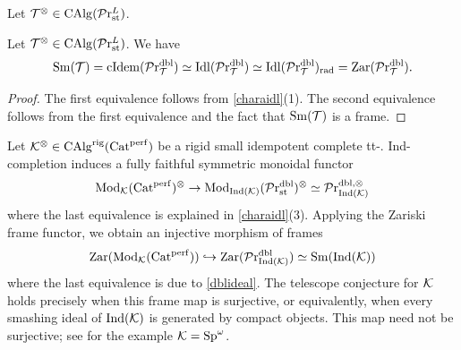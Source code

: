 \documentclass[10pt,a4paper,oneside]{article}
\begin{document}
\begin{rem}\label{charaidl}
Let $\totimes\in \calg(\prlst)$.
\end{rem}

\begin{thm}\label{dblideal}
Let $\totimes\in\calg(\prlst)$. We have
\[
\op{Sm}(\mct) = \cidem(\lintdbl)\simeq\idl(\lintdbl)\simeq\idl(\lintdbl)_{\op{rad}}=\zar(\lintdbl).
\]
\end{thm}

\begin{proof}
The first equivalence follows from \cref{charaidl}(1). The second equivalence follows from the first equivalence and the fact that $\op{Sm}(\mct)$ is a frame.
\end{proof}

\begin{rem}
Let $\mck^\otimes \in \calg^{\op{rig}}(\catper)$ be a rigid small idempotent complete tt-\infcat. Ind-completion induces a fully faithful symmetric monoidal functor
\[
\modu_{\mck}(\catper)^\otimes\to \modu_{\op{Ind}(\mck)}(\prstdbl)^\otimes\simeq \pr^{\op{dbl},\otimes}_{\op{Ind}(\mck)}\]
where the last equivalence is explained in \cref{charaidl}(3). Applying the Zariski frame functor, we obtain an injective morphism of frames
\[
\zar(\modu_{\mck}(\catper))\hookrightarrow \zar(\pr^{\op{dbl}}_{\op{Ind(\mck)}})\simeq\op{Sm}(\op{Ind}(\mck))
\]
where the last equivalence is due to \cref{dblideal}. The telescope conjecture for $\mck$ holds precisely when this frame map is surjective, or equivalently, when every smashing ideal of $\op{Ind}(\mck)$ is generated by compact objects. This map need not be surjective; see \cite{burklund2023k} for the example $\mck=\opsp^\omega$.
\end{rem}
\end{document}
